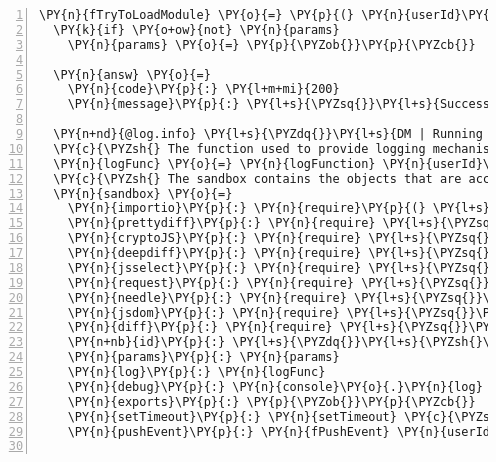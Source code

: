 \begin{Verbatim}[fontsize=\scriptsize,commandchars=\\\{\},numbers=left,firstnumber=1,stepnumber=1]
\PY{n}{fTryToLoadModule} \PY{o}{=} \PY{p}{(} \PY{n}{userId}\PY{p}{,} \PY{n}{oRule}\PY{p}{,} \PY{n}{modId}\PY{p}{,} \PY{n}{src}\PY{p}{,} \PY{n}{modType}\PY{p}{,} \PY{n}{dbMod}\PY{p}{,} \PY{n}{params}\PY{p}{,} \PY{n}{cb} \PY{p}{)} \PY{o}{=}\PY{o}{\PYZgt{}}
  \PY{k}{if} \PY{o+ow}{not} \PY{n}{params}
    \PY{n}{params} \PY{o}{=} \PY{p}{\PYZob{}}\PY{p}{\PYZcb{}}

  \PY{n}{answ} \PY{o}{=}
    \PY{n}{code}\PY{p}{:} \PY{l+m+mi}{200}
    \PY{n}{message}\PY{p}{:} \PY{l+s}{\PYZsq{}}\PY{l+s}{Successfully compiled}\PY{l+s}{\PYZsq{}}

  \PY{n+nd}{@log.info} \PY{l+s}{\PYZdq{}}\PY{l+s}{DM | Running module }\PY{l+s}{\PYZsq{}}\PY{l+s}{\PYZsh{}\PYZob{} modId \PYZcb{}}\PY{l+s}{\PYZsq{}}\PY{l+s}{ for user }\PY{l+s}{\PYZsq{}}\PY{l+s}{\PYZsh{}\PYZob{} userId \PYZcb{}}\PY{l+s}{\PYZsq{}}\PY{l+s}{\PYZdq{}}
  \PY{c}{\PYZsh{} The function used to provide logging mechanisms on a per rule basis}
  \PY{n}{logFunc} \PY{o}{=} \PY{n}{logFunction} \PY{n}{userId}\PY{p}{,} \PY{n}{oRule}\PY{o}{.}\PY{n}{id}\PY{p}{,} \PY{n}{modId}
  \PY{c}{\PYZsh{} The sandbox contains the objects that are accessible to the user }
  \PY{n}{sandbox} \PY{o}{=} 
    \PY{n}{importio}\PY{p}{:} \PY{n}{require}\PY{p}{(} \PY{l+s}{\PYZsq{}}\PY{l+s}{import\PYZhy{}io}\PY{l+s}{\PYZsq{}} \PY{p}{)}\PY{o}{.}\PY{n}{client}
    \PY{n}{prettydiff}\PY{p}{:} \PY{n}{require} \PY{l+s}{\PYZsq{}}\PY{l+s}{prettydiff}\PY{l+s}{\PYZsq{}}
    \PY{n}{cryptoJS}\PY{p}{:} \PY{n}{require} \PY{l+s}{\PYZsq{}}\PY{l+s}{crypto\PYZhy{}js}\PY{l+s}{\PYZsq{}}
    \PY{n}{deepdiff}\PY{p}{:} \PY{n}{require} \PY{l+s}{\PYZsq{}}\PY{l+s}{deep\PYZhy{}diff}\PY{l+s}{\PYZsq{}}
    \PY{n}{jsselect}\PY{p}{:} \PY{n}{require} \PY{l+s}{\PYZsq{}}\PY{l+s}{js\PYZhy{}select}\PY{l+s}{\PYZsq{}}
    \PY{n}{request}\PY{p}{:} \PY{n}{require} \PY{l+s}{\PYZsq{}}\PY{l+s}{request}\PY{l+s}{\PYZsq{}}
    \PY{n}{needle}\PY{p}{:} \PY{n}{require} \PY{l+s}{\PYZsq{}}\PY{l+s}{needle}\PY{l+s}{\PYZsq{}}
    \PY{n}{jsdom}\PY{p}{:} \PY{n}{require} \PY{l+s}{\PYZsq{}}\PY{l+s}{jsdom}\PY{l+s}{\PYZsq{}}
    \PY{n}{diff}\PY{p}{:} \PY{n}{require} \PY{l+s}{\PYZsq{}}\PY{l+s}{diff}\PY{l+s}{\PYZsq{}}
    \PY{n+nb}{id}\PY{p}{:} \PY{l+s}{\PYZdq{}}\PY{l+s}{\PYZsh{}\PYZob{} userId \PYZcb{}.\PYZsh{}\PYZob{} oRule.id \PYZcb{}.\PYZsh{}\PYZob{} modId \PYZcb{}.vm}\PY{l+s}{\PYZdq{}}
    \PY{n}{params}\PY{p}{:} \PY{n}{params}
    \PY{n}{log}\PY{p}{:} \PY{n}{logFunc}
    \PY{n}{debug}\PY{p}{:} \PY{n}{console}\PY{o}{.}\PY{n}{log}
    \PY{n}{exports}\PY{p}{:} \PY{p}{\PYZob{}}\PY{p}{\PYZcb{}}
    \PY{n}{setTimeout}\PY{p}{:} \PY{n}{setTimeout} \PY{c}{\PYZsh{} This one allows probably too much}
    \PY{n}{pushEvent}\PY{p}{:} \PY{n}{fPushEvent} \PY{n}{userId}\PY{p}{,} \PY{n}{oRule}\PY{p}{,} \PY{n}{modType}


\end{Verbatim}
